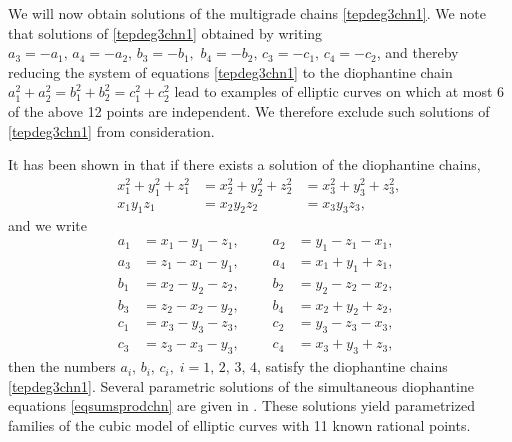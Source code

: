 \documentclass[11pt, leqno]{article}
\begin{document}
We will now obtain solutions of the multigrade chains \eqref{tepdeg3chn1}. We note that  solutions of \eqref{tepdeg3chn1} obtained by writing $a_3=-a_1,\,a_4=-a_2,\,b_3=-b_1,$ $ b_4=-b_2,\,c_3=-c_1,\,c_4=-c_2$, and thereby reducing the system of equations \eqref{tepdeg3chn1} to the diophantine chain $a_1^2+a_2^2=b_1^2+b_2^2=c_1^2+c_2^2$ lead to examples of elliptic curves on which at most 6 of the above 12 points are independent. We therefore exclude such solutions of \eqref{tepdeg3chn1} from consideration.

 It has been shown in \cite{ChW} that if there exists a solution  of the diophantine chains,
\begin{equation}
\begin{aligned}
x_1^2+y_1^2+z_1^2&=x_2^2+y_2^2+z_2^2&=x_3^2+y_3^2+z_3^2,\\
x_1y_1z_1&=x_2y_2z_2&=x_3y_3z_3,\quad \quad \;\;
\end{aligned}
\label{eqsumsprodchn}
\end{equation}
and we write
\begin{equation}
\begin{aligned}
a_1& = x_1 - y_1 - z_1,\quad \;\;& a_2& = y_1 - z_1 - x_1,\;\;\\
 a_3& = z_1 - x_1 - y_1,\;\; & a_4& = x_1 + y_1 + z_1,\\
b_1& = x_2 - y_2 - z_2,& b_2& = y_2 - z_2 - x_2, \\
b_3& = z_2 - x_2 - y_2, & b_4& = x_2 + y_2 + z_2,\\
c_1& = x_3 - y_3 - z_3,& c_2& = y_3 - z_3 - x_3, \\
c_3& = z_3 - x_3 - y_3, & c_4& = x_3 + y_3 + z_3,
\end{aligned} \label{valabc}
\end{equation}
then the numbers $a_i,\, b_i, \,c_i,\;i=1,\,2,\,3,\,4$, satisfy the diophantine chains \eqref{tepdeg3chn1}. Several  parametric solutions of the simultaneous diophantine equations \eqref{eqsumsprodchn} are given in \cite{ChW}. These solutions yield parametrized families of the cubic model of elliptic curves  with 11 known rational points. 
\end{document}
